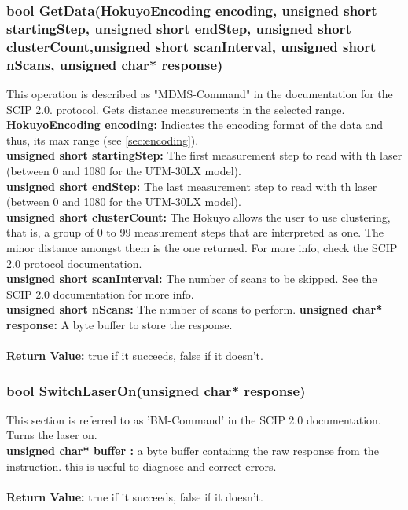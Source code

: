 \documentclass{book}
\begin{document}
\subsubsection{bool GetData(HokuyoEncoding encoding, unsigned short startingStep,
		unsigned short endStep, unsigned short clusterCount,unsigned short scanInterval, 
		unsigned short nScans, unsigned char* response)}
This operation is described as "MDMS-Command" in the documentation for the SCIP 2.0. protocol. Gets distance measurements in the selected range.\\
\textbf{HokuyoEncoding encoding: }Indicates the encoding format of the data and thus, its max range (see \ref{sec:encoding}).\\
\textbf{unsigned short startingStep: }The first measurement step to read with th laser (between 0 and 1080 for the UTM-30LX model).\\
\textbf{unsigned short endStep: }The last measurement step to read with th laser (between 0 and 1080 for the UTM-30LX model).\\	
\textbf{unsigned short clusterCount: } The Hokuyo allows the user to use clustering, that is, a group of 0 to 99 measurement steps that are interpreted as one. The minor distance amongst them is the one returned. For more info, check the SCIP 2.0 protocol documentation.\\
\textbf{unsigned short scanInterval: } The number of scans to be skipped. See the SCIP 2.0 documentation for more info.\\
\textbf{unsigned short nScans: }The number of scans to perform.
\textbf{ unsigned char* response: } A byte buffer to store the response.\\\\

\textbf{Return Value: }true if it succeeds, false if it doesn't.\\

\subsubsection{bool SwitchLaserOn(unsigned char* response)}
This section is referred to as 'BM-Command' in the SCIP 2.0 documentation. Turns the laser on.\\
\textbf{unsigned char* buffer : } a byte buffer containng the raw response from the instruction. this is useful to diagnose and correct errors.\\\\
\textbf{Return Value: }true if it succeeds, false if it doesn't.\\
\end{document}

